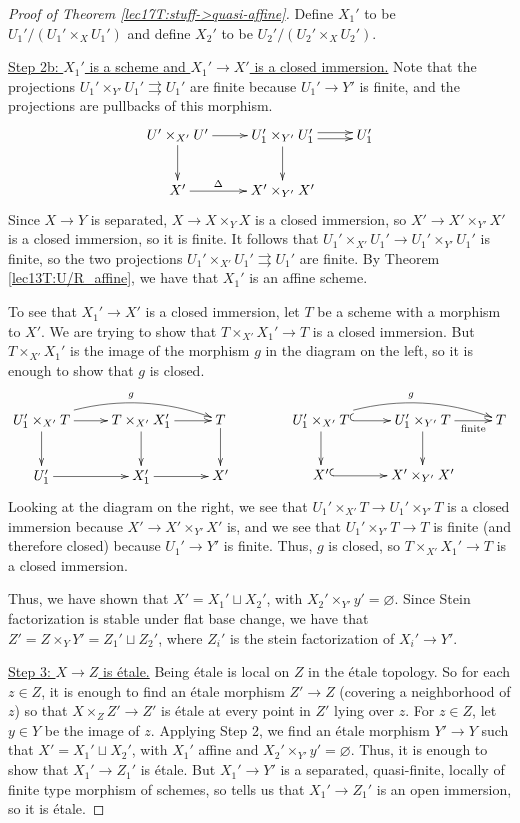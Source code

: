 \begin{proof}[Proof of Theorem \ref{lec17T:stuff->quasi-affine}]
   Define $X_1'$ to be $U_1'/(U_1'\times_X U_1')$ and define $X_2'$ to be
   $U_2'/(U_2'\times_X U_2')$.

   \underline{Step 2b: $X_1'$ is a scheme and $X_1'\to X'$ is a closed immersion.} Note
   that the projections $U_1'\times_{Y'}U_1'\rightrightarrows U_1'$ are finite because
   $U_1'\to Y'$ is finite, and the projections are pullbacks of this morphism.
   \[\xymatrix{
   U'\times_{X'}U' \ar[r] \ar[d] & U_1'\times_{Y'}U_1' \ar[d]
   \ar@<.5ex>[r]\ar@<-.5ex>[r] & U_1'\\
   X' \ar[r]^<>(.5)\Delta & X'\times_{Y'}X'
   }\]
    Since $X\to Y$ is separated, $X\to X\times_Y X$ is a closed immersion, so $X'\to
   X'\times_{Y'}X'$ is a closed immersion, so it is finite. It follows that
   $U_1'\times_{X'} U_1'\to U_1'\times_{Y'}U_1'$ is finite, so the two projections
   $U_1'\times_{X'}U_1'\rightrightarrows U_1'$ are finite.  By Theorem \ref{lec13T:U/R_affine}, we have that
   $X_1'$ is an affine scheme.

   To see that $X_1'\to X'$ is a closed immersion, let $T$ be a scheme with a morphism to
   $X'$. We are trying to show that $T\times_{X'}X_1'\to T$ is a closed immersion. But
   $T\times_{X'}X_1'$ is the image of the morphism $g$ in the diagram on the left, so it
   is enough to show that $g$ is closed.
   \[\xymatrix{
   U_1'\times_{X'} T \ar[d]\ar[r] \ar@/^3ex/[rr]^g & T\times_{X'}X_1'\ar[r] \ar[d]& T\ar[d]\\
   U_1' \ar[r]& X_1' \ar[r] & X'
   }\qquad\qquad\xymatrix{
   U_1'\times_{X'} T \ar@/^3ex/[rr]^g \ar[d]\ar@{^(->}[r]  & U_1'\times_{Y'}T \ar[r]_<>(.5){\text{finite}} \ar[d]& T\\
   X' \ar@{^(->}[r]& X'\times_{Y'}X'
   }\]
    Looking at the diagram on the right, we see that $U_1'\times_{X'}T\to
   U_1'\times_{Y'}T$ is a closed immersion because $X'\to X'\times_{Y'}X'$ is, and we see
   that $U_1'\times_{Y'}T\to T$ is finite (and therefore closed) because $U_1'\to Y'$ is
   finite. Thus, $g$ is closed, so $T\times_{X'}X_1'\to T$ is a closed immersion.

   Thus, we have shown that $X'=X_1'\sqcup X_2'$, with $X_2'\times_{Y'}y'=\varnothing$.
   Since Stein factorization is stable under flat base change, we have that $Z'=Z\times_Y
   Y'=Z_1'\sqcup Z_2'$, where $Z_i'$ is the stein factorization of $X_i'\to Y'$.

   \underline{Step 3: $X\to Z$ is \'etale.} Being \'etale is local on $Z$ in the \'etale
   topology. So for each $z\in Z$, it is enough to find an \'etale morphism $Z'\to Z$
   (covering a neighborhood of $z$) so that $X\times_Z Z'\to Z'$ is \'etale at every
   point in $Z'$ lying over $z$. For $z\in Z$, let $y\in Y$ be the image of $z$. Applying
   Step 2, we find an \'etale morphism $Y'\to Y$ such that $X'=X_1'\sqcup X_2'$, with
   $X_1'$ affine and $X_2'\times_{Y'}y'=\varnothing$. Thus, it is enough to show that
   $X_1'\to Z_1'$ is \'etale. But $X_1'\to Y'$ is a separated, quasi-finite, locally of
   finite type morphism of schemes, so \cite[IV.18.12.12]{EGA} tells us that $X_1'\to
   Z_1'$ is an open immersion, so it is \'etale.


\end{proof}
